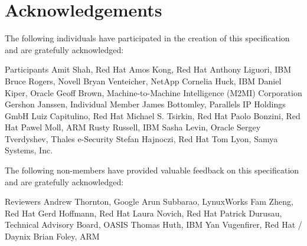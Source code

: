 \chapter{Acknowledgements}

The following individuals have participated in the creation of this specification and are gratefully acknowledged:

\begin{oasistitlesection}{Participants}
Amit Shah,	Red Hat	\newline
Amos Kong,	Red Hat	\newline
Anthony Liguori,	IBM	\newline
Bruce Rogers,	Novell	\newline
Bryan Venteicher,	NetApp	\newline
Cornelia Huck,	IBM	\newline
Daniel Kiper,	Oracle	\newline
Geoff Brown,	Machine-to-Machine Intelligence (M2MI) Corporation	\newline
Gershon Janssen,	Individual Member	\newline
James Bottomley,	Parallels IP Holdings GmbH	\newline
Luiz Capitulino,	Red Hat	\newline
Michael S. Tsirkin,	Red Hat	\newline
Paolo Bonzini,	Red Hat	\newline
Pawel Moll,	ARM \newline
Rusty Russell,	IBM	\newline
Sasha Levin,	Oracle	\newline
Sergey Tverdyshev,	Thales e-Security	\newline
Stefan Hajnoczi,	Red Hat	\newline
Tom Lyon,	Samya Systems, Inc.	\newline
\end{oasistitlesection}

The following non-members have provided valuable feedback on this
specification and are gratefully acknowledged:

\begin{oasistitlesection}{Reviewers}
Andrew Thornton,  Google \newline
Arun Subbarao,	LynuxWorks	\newline
Fam Zheng, Red Hat	\newline
Gerd Hoffmann, Red Hat	\newline
Laura Novich, Red Hat	\newline
Patrick Durusau,	Technical Advisory Board, OASIS	\newline
Thomas Huth,	IBM	\newline
Yan Vugenfirer, Red Hat / Daynix	\newline
Brian Foley,  ARM \newline
\end{oasistitlesection}
